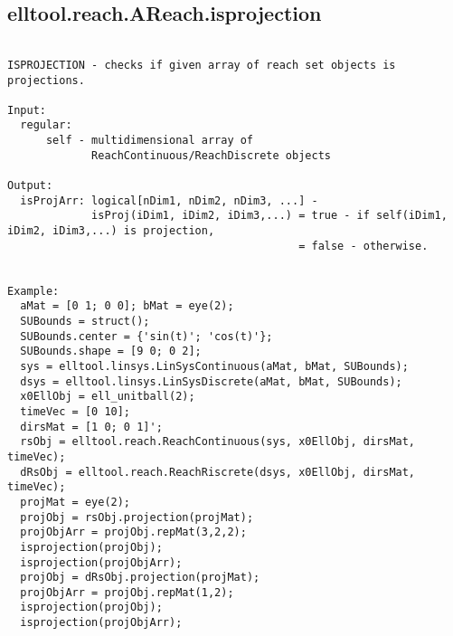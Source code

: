 \subsection{\texorpdfstring{elltool.reach.AReach.isprojection}{isprojection}}\label{method:elltool.reach.AReach.isprojection}
\begin{verbatim}

ISPROJECTION - checks if given array of reach set objects is projections.

Input:
  regular:
      self - multidimensional array of
             ReachContinuous/ReachDiscrete objects

Output:
  isProjArr: logical[nDim1, nDim2, nDim3, ...] -
             isProj(iDim1, iDim2, iDim3,...) = true - if self(iDim1, iDim2, iDim3,...) is projection,
                                             = false - otherwise.


Example:
  aMat = [0 1; 0 0]; bMat = eye(2);
  SUBounds = struct();
  SUBounds.center = {'sin(t)'; 'cos(t)'};
  SUBounds.shape = [9 0; 0 2];
  sys = elltool.linsys.LinSysContinuous(aMat, bMat, SUBounds);
  dsys = elltool.linsys.LinSysDiscrete(aMat, bMat, SUBounds);
  x0EllObj = ell_unitball(2);
  timeVec = [0 10];
  dirsMat = [1 0; 0 1]';
  rsObj = elltool.reach.ReachContinuous(sys, x0EllObj, dirsMat, timeVec);
  dRsObj = elltool.reach.ReachRiscrete(dsys, x0EllObj, dirsMat, timeVec);
  projMat = eye(2);
  projObj = rsObj.projection(projMat);
  projObjArr = projObj.repMat(3,2,2);
  isprojection(projObj);
  isprojection(projObjArr);
  projObj = dRsObj.projection(projMat);
  projObjArr = projObj.repMat(1,2);
  isprojection(projObj);
  isprojection(projObjArr);
\end{verbatim}
